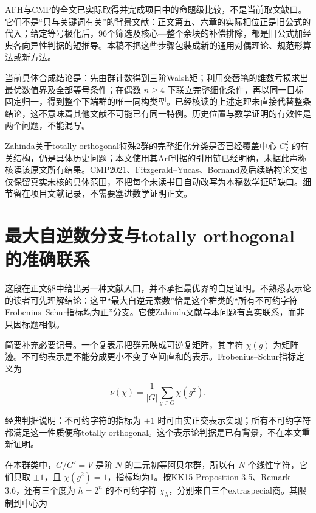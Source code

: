 \documentclass[UTF8,fontset=fandol,zihao=-4,openany,oneside]{ctexbook}
\begin{document}
AFH与CMP的全文已实际取得并完成项目中的命题级比较，不是当前取文缺口。它们不是“只与关键词有关”的背景文献：正文第五、六章的实际相位正是旧公式的代入；给定等号极化后，96个筛选及核心—整个余块的补偿排除，都是旧公式加经典各向异性判据的短推导。本稿不把这些步骤包装成新的通用对偶理论、规范形算法或新方法。



当前具体合成结论是：先由群计数得到三阶Walsh矩；利用交替笔的维数亏损求出最优数值界及全部等号条件；在偶数 \(n\ge4\) 下联立完整细化条件，再以同一目标固定归一，得到整个下端群的唯一同构类型。已经核读的上述定理未直接代替整条结论，这不意味着其他文献不可能已有同一特例。历史位置与数学证明的有效性是两个问题，不能混写。



Zahinda关于totally orthogonal特殊2群的完整细化分类是否已经覆盖中心 \(C_2^2\) 的有关结构，仍是具体历史问题；本文使用其Arf判据的引用链已经明确，未据此声称核读该原文所有结果。CMP2021、Fitzgerald–Yucas、Bornand及后续结构论文也仅保留真实未核的具体范围，不把每个未读书目自动改写为本稿数学证明缺口。细节留在项目文献记录，不需要塞进数学证明正文。



\section{最大自逆数分支与totally orthogonal的准确联系}


这段在正文§8中给出另一种文献入口，并不承担最优界的自足证明。不熟悉表示论的读者可先理解结论：这里“最大自逆元素数”恰是这个群类的“所有不可约字符Frobenius–Schur指标均为正”分支。它使Zahinda文献与本问题有真实联系，而非只因标题相似。



简要补充必要记号。一个复表示把群元映成可逆复矩阵，其字符 \(\chi(g)\) 为矩阵迹。不可约表示是不能分成更小不变子空间直和的表示。Frobenius–Schur指标定义为



\[
\nu(\chi)=\frac1{|G|}\sum_{g\in G}\chi(g^2).
\]



经典判据说明：不可约字符的指标为 \(+1\) 时可由实正交表示实现；所有不可约字符都满足这一性质便称totally orthogonal。这个表示论判据是已有背景，不在本文重新证明。



在本群类中，\(G/G'=V\) 是阶 \(N\) 的二元初等阿贝尔群，所以有 \(N\) 个线性字符，它们只取 \(\pm1\)，且 \(\chi(g^2)=1\)，指标均为1。按KK15 Proposition 3.5、Remark 3.6，还有三个度为 \(h=2^n\) 的不可约字符 \(\chi_\lambda\)，分别来自三个extraspecial商。其限制到中心为
\end{document}
